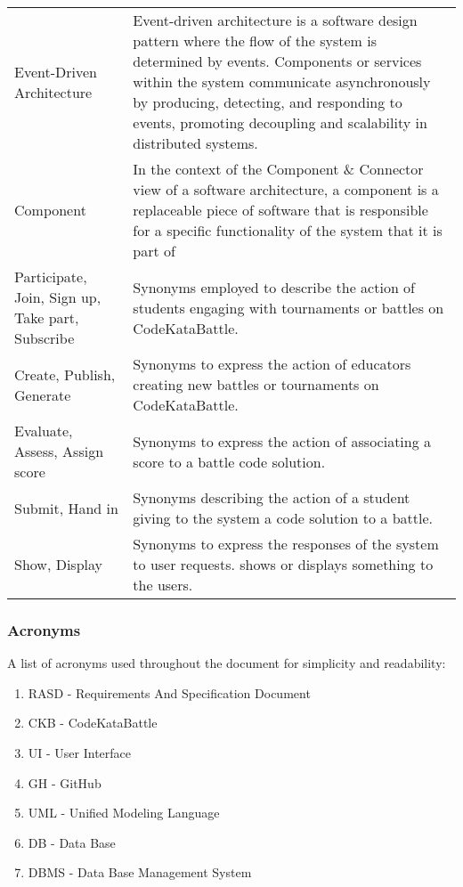 \begin{longtable}[]{m{5cm} m{9cm}}
	Event-Driven Architecture & Event-driven architecture is a software design pattern where the flow of the system is determined by events. Components or services within the system communicate asynchronously by producing, detecting, and responding to events, promoting decoupling and scalability in distributed systems.\\
	
	Component & In the context of the Component \& Connector view of a software architecture, a component is a replaceable piece of software that is responsible for a specific functionality of the system that it is part of\\
	
	Participate, Join, Sign up, Take part, Subscribe & Synonyms employed to describe the action of students engaging with tournaments or battles on CodeKataBattle.\\
	
	Create, Publish, Generate & Synonyms to express the action of educators creating new battles or tournaments on CodeKataBattle. \\
	
	Evaluate, Assess, Assign score & Synonyms to express the action of associating a score to a battle code solution.\\
	
	Submit, Hand in & Synonyms describing the action of a student giving to the system a code solution to a battle.\\
	
	Show, Display & Synonyms to express the responses of the system to user requests. \app shows or displays something to the users.
	
	
\end{longtable}
\setlength{\tabcolsep}{6pt}

\subsubsection{Acronyms}
A list of acronyms used throughout the document for simplicity and readability:
\begin{enumerate}
	\item RASD - Requirements And Specification Document
	\item CKB - CodeKataBattle
	\item UI - User Interface
	\item GH - GitHub
	\item UML - Unified Modeling Language
	\item DB - Data Base
	\item DBMS - Data Base Management System
\end{enumerate}